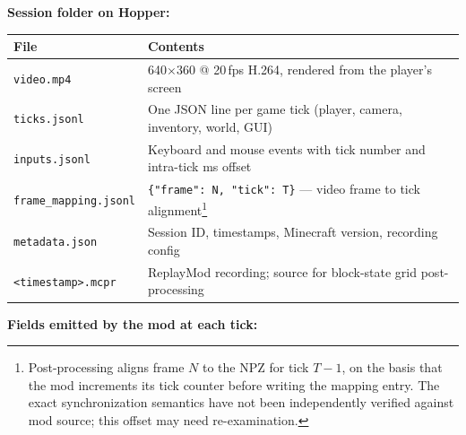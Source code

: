 \documentclass[11pt,a4paper]{article}
\begin{document}
\textbf{Session folder on Hopper:}

\begin{center}
\begin{tabular}{ll}
\toprule
File & Contents \\
\midrule
\texttt{video.mp4} & 640$\times$360 @ 20\,fps H.264, rendered from the player's screen \\
\texttt{ticks.jsonl} & One JSON line per game tick (player, camera, inventory, world, GUI) \\
\texttt{inputs.jsonl} & Keyboard and mouse events with tick number and intra-tick ms offset \\
\texttt{frame\_mapping.jsonl} & \texttt{\{"frame":\,N,\,"tick":\,T\}} --- video frame to tick alignment\footnote{Post-processing aligns frame $N$ to the NPZ for tick $T{-}1$, on the basis that the mod increments its tick counter before writing the mapping entry. The exact synchronization semantics have not been independently verified against mod source; this offset may need re-examination.} \\
\texttt{metadata.json} & Session ID, timestamps, Minecraft version, recording config \\
\texttt{<timestamp>.mcpr} & ReplayMod recording; source for block-state grid post-processing \\
\bottomrule
\end{tabular}
\end{center}

\textbf{Fields emitted by the mod at each tick:}
\end{document}
